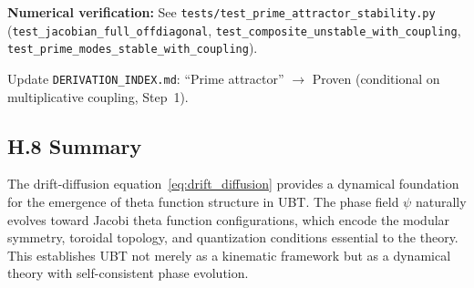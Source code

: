 \textbf{Numerical verification:} See \texttt{tests/test\_prime\_attractor\_stability.py}
(\texttt{test\_jacobian\_full\_offdiagonal}, \texttt{test\_composite\_unstable\_with\_coupling},
\texttt{test\_prime\_modes\_stable\_with\_coupling}).

Update \texttt{DERIVATION\_INDEX.md}: ``Prime attractor'' $\to$ Proven (conditional on multiplicative coupling, Step~1).

\subsection*{H.8 Summary}

The drift-diffusion equation~\eqref{eq:drift_diffusion} provides a dynamical foundation for the emergence of theta function structure in UBT. The phase field $\psi$ naturally evolves toward Jacobi theta function configurations, which encode the modular symmetry, toroidal topology, and quantization conditions essential to the theory. This establishes UBT not merely as a kinematic framework but as a dynamical theory with self-consistent phase evolution.
